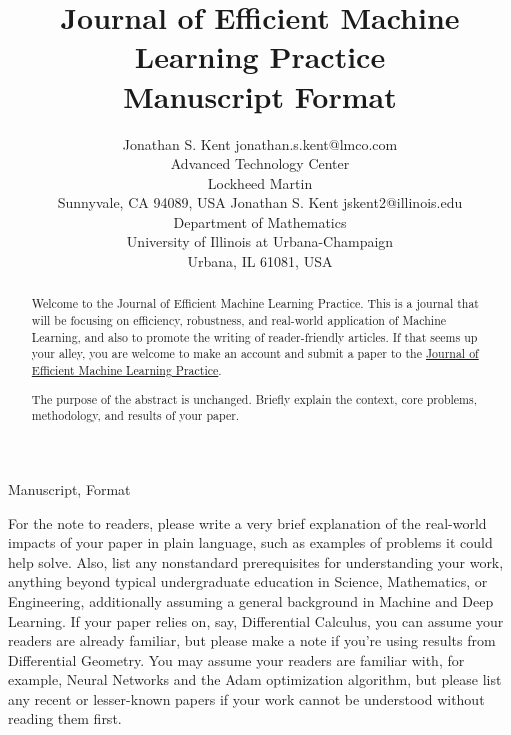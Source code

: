 \documentclass[twoside,12pt]{article}
\begin{document}
\title{Journal of Efficient Machine Learning Practice\\ Manuscript Format}

\author{\name Jonathan S. Kent \email jonathan.s.kent@lmco.com \\
       \addr Advanced Technology Center\\
       Lockheed Martin\\
       Sunnyvale, CA 94089, USA
       \AND
       \name Jonathan S. Kent \email jskent2@illinois.edu \\
       \addr Department of Mathematics\\
       University of Illinois at Urbana-Champaign\\
       Urbana, IL 61081, USA}


\maketitle

\begin{abstract}
Welcome to the Journal of Efficient Machine Learning Practice. This is a journal that will be focusing on efficiency, robustness, and real-world application of Machine Learning, and also to promote the writing of reader-friendly articles. If that seems up your alley, you are welcome to make an account and submit a paper to the \href{https:\\www.jemlp.org}{Journal of Efficient Machine Learning Practice}.

The purpose of the abstract is unchanged. Briefly explain the context, core problems, methodology, and results of your paper.
\end{abstract}

\begin{keywords}
  Manuscript, Format
\end{keywords}

\begin{readnote}
For the note to readers, please write a very brief explanation of the real-world impacts of your paper in plain language, such as examples of problems it could help solve. Also, list any nonstandard prerequisites for understanding your work, anything beyond typical undergraduate education in Science, Mathematics, or Engineering, additionally assuming a general background in Machine and Deep Learning. If your paper relies on, say, Differential Calculus, you can assume your readers are already familiar, but please make a note if you're using results from Differential Geometry. You may assume your readers are familiar with, for example, Neural Networks and the Adam optimization algorithm, but please list any recent or lesser-known papers if your work cannot be understood without reading them first.
\end{readnote}
\end{document}
